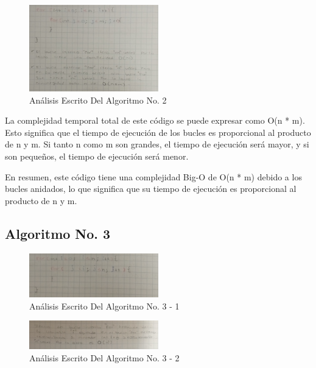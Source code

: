 \documentclass[journal, spanish]{IEEEtran}
\begin{document}
\begin{figure}[H]
  \centering
  \includegraphics[width=0.5\textwidth]{images/Captura de pantalla 2023-09-13 030452.png}
  \caption{Análisis Escrito Del Algoritmo No. 2}
  \label{fig:nombre_de_tu_imagen}
\end{figure}

La complejidad temporal total de este código se puede expresar como O(n * m). Esto significa que el tiempo de ejecución de los bucles es proporcional al producto de n y m. Si tanto n como m son grandes, el tiempo de ejecución será mayor, y si son pequeños, el tiempo de ejecución será menor.

En resumen, este código tiene una complejidad Big-O de O(n * m) debido a los bucles anidados, lo que significa que su tiempo de ejecución es proporcional al producto de n y m.

\subsection{Algoritmo No. 3}

\begin{figure}[H]
  \centering
  \includegraphics[width=0.5\textwidth]{images/Captura de pantalla 2023-09-13 030912.png}
  \caption{Análisis Escrito Del Algoritmo No. 3 - 1}
  \label{fig:nombre_de_tu_imagen}
\end{figure}

\begin{figure}[H]
  \centering
  \includegraphics[width=0.5\textwidth]{images/Captura de pantalla 2023-09-13 030943.png}
  \caption{Análisis Escrito Del Algoritmo No. 3 - 2}
  \label{fig:nombre_de_tu_imagen}
\end{figure}
\end{document}
